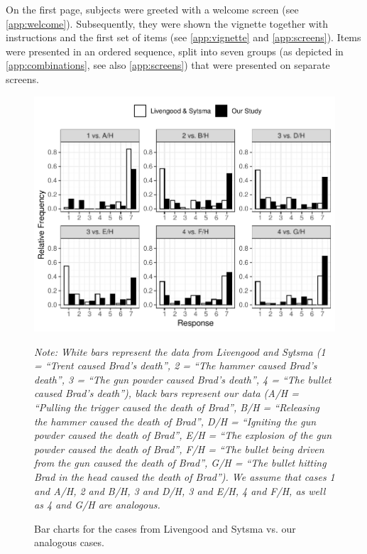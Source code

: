 \documentclass[12pt]{scrartcl}
\begin{document}
On the first page, subjects were greeted with a welcome screen (see \autoref{app:welcome}). Subsequently, they were shown the vignette together with instructions and the first set of items (see \autoref{app:vignette} and \ref{app:screens}). Items were presented in an ordered sequence, split into seven groups (as depicted in \autoref{app:combinations}, see also \autoref{app:screens}) that were presented on separate screens.

\begin{figure}[th!]
   \centering
   \includegraphics[width=\textwidth]{figures/comparison.pdf}
   \begin{minipage}{\linewidth}
      \emph{Note: White bars represent the data from Livengood and Sytsma (1 = \enquote{Trent caused Brad's death}, 2 = \enquote{The hammer caused Brad's death}, 3 = \enquote{The gun powder caused Brad's death}, 4 = \enquote{The bullet caused Brad's death}), black bars represent our data (A/H = \enquote{Pulling the trigger caused the death of Brad}, B/H = \enquote{Releasing the hammer caused the death of Brad}, D/H = \enquote{Igniting the gun powder caused the death of Brad}, E/H = \enquote{The explosion of the gun powder caused the death of Brad}, F/H = \enquote{The bullet being driven from the gun caused the death of Brad}, G/H = \enquote{The bullet hitting Brad in the head caused the death of Brad}). We assume that cases 1 and A/H, 2 and B/H, 3 and D/H, 3 and E/H, 4 and F/H, as well as 4 and G/H are analogous.}
   \end{minipage}
   \caption{Bar charts for the cases from Livengood and Sytsma vs. our analogous cases.}
   \label{fig:plot}
\end{figure}
\end{document}
